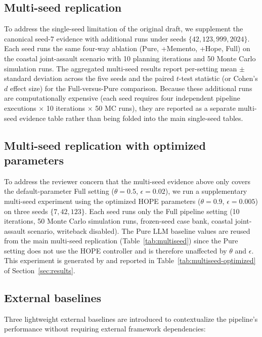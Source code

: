 \subsection{Multi-seed replication}

To address the single-seed limitation of the original draft, we supplement the canonical seed-7 evidence with additional runs under seeds $\{42, 123, 999, 2024\}$. Each seed runs the same four-way ablation (Pure, +Memento, +Hope, Full) on the coastal joint-assault scenario with 10 planning iterations and 50 Monte Carlo simulation runs. The aggregated multi-seed results report per-setting mean $\pm$ standard deviation across the five seeds and the paired $t$-test statistic (or Cohen's $d$ effect size) for the Full-versus-Pure comparison. Because these additional runs are computationally expensive (each seed requires four independent pipeline executions $\times$ 10 iterations $\times$ 50 MC runs), they are reported as a separate multi-seed evidence table rather than being folded into the main single-seed tables.

\subsection{Multi-seed replication with optimized parameters}

To address the reviewer concern that the multi-seed evidence above only covers the default-parameter Full setting ($\theta=0.5$, $\epsilon=0.02$), we run a supplementary multi-seed experiment using the optimized HOPE parameters ($\theta=0.9$, $\epsilon=0.005$) on three seeds $\{7, 42, 123\}$. Each seed runs only the Full pipeline setting (10 iterations, 50 Monte Carlo simulation runs, frozen-seed case bank, coastal joint-assault scenario, writeback disabled). The Pure LLM baseline values are reused from the main multi-seed replication (Table~\ref{tab:multiseed}) since the Pure setting does not use the HOPE controller and is therefore unaffected by $\theta$ and $\epsilon$. This experiment is generated by  and reported in Table~\ref{tab:multiseed-optimized} of Section~\ref{sec:results}.

\subsection{External baselines}

Three lightweight external baselines are introduced to contextualize the pipeline's performance without requiring external framework dependencies:

